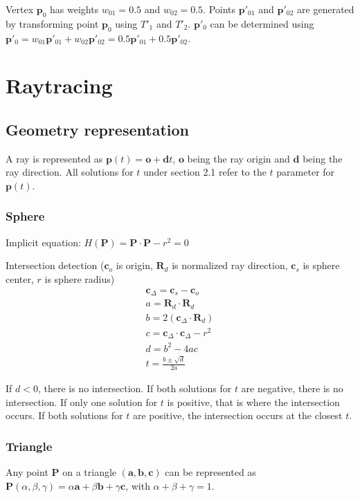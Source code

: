 \documentclass[12pt]{article}
\begin{document}
Vertex $\bm p_0$ has weights $w_{01} = 0.5$ and $w_{02} = 0.5$. Points
$\bm p'_{01}$ and $\bm p'_{02}$ are generated by transforming point
$\bm p_0$ using $T'_1$ and $T'_2$. $\bm p'_0$ can be determined using
$\bm p'_0 = w_{01}\bm p'_{01} + w_{02}\bm p'_{02} = 0.5\bm p'_{01} + 0.5
\bm p'_{02}$.

\section{Raytracing}

\subsection{Geometry representation}

A ray is represented as $\bm p(t) = \bm o + \bm d t$, $\bm o$
being the ray origin and $\bm d$ being the ray direction. All
solutions for $t$ under section 2.1 refer
to the $t$ parameter for $\bm p(t)$.

\subsubsection{Sphere}

Implicit equation: $H(\bm P) = \bm P \cdot \bm P - r^2 = 0$

Intersection detection ($\bm c_o$ is origin, $\bm R_d$ is
normalized ray direction, $\bm c_s$ is sphere center, $r$ is
sphere radius)
\begin{gather*}
    \bm c_{\Delta} = \bm c_s - \bm c_o\\
    a = \bm R_d \cdot \bm R_d\\
    b = 2(\bm c_{\Delta} \cdot \bm R_d)\\
    c = \bm c_{\Delta} \cdot \bm c_{\Delta} - r^2\\
    d = b^2 - 4ac\\
    t = \frac{b \pm \sqrt{d}}{2a}
\end{gather*}

If $d < 0$, there is no intersection. If both solutions for $t$
are negative, there is no intersection.
If only one solution for $t$ is positive, that is where the
intersection occurs. If both solutions for $t$ are positive,
the intersection occurs at the closest $t$.

\subsubsection{Triangle}

Any point $\bm P$ on a triangle $(\bm a,\bm b,\bm c)$ can be represented as $\bm P(
\alpha,\beta,\gamma) = \alpha \bm a + \beta \bm b + \gamma \bm
c$, with $\alpha + \beta + \gamma = 1$.
\end{document}

